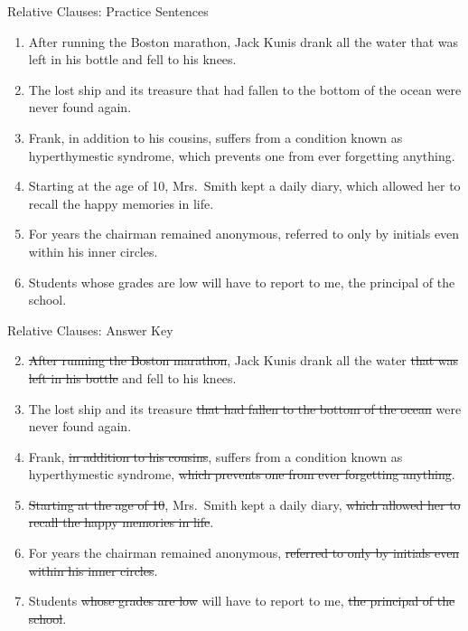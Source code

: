 \documentclass[aspectratio=169,11pt]{beamer}
\begin{document}
\begin{frame}{Relative Clauses: Practice Sentences}
\small
\begin{enumerate}
  \setcounter{enumi}{0} %
  \item After running the Boston marathon, Jack Kunis drank all the water that was left in his bottle and fell to his knees.
  \item The lost ship and its treasure that had fallen to the bottom of the ocean were never found again.
  \item Frank, in addition to his cousins, suffers from a condition known as hyperthymestic syndrome, which prevents one from ever forgetting anything.
  \item Starting at the age of 10, Mrs.\ Smith kept a daily diary, which allowed her to recall the happy memories in life.
  \item For years the chairman remained anonymous, referred to only by initials even within his inner circles.
  \item Students whose grades are low will have to report to me, the principal of the school.
\end{enumerate}
\end{frame}


\begin{frame}{Relative Clauses: Answer Key}
\small
\begin{enumerate}
  \setcounter{enumi}{1}
  \item \sout{After running the Boston marathon}, Jack Kunis drank all the water \sout{that was left in his bottle} and fell to his knees.
  \item The lost ship and its treasure \sout{that had fallen to the bottom of the ocean} were never found again.
  \item Frank, \sout{in addition to his cousins}, suffers from a condition known as hyperthymestic syndrome, \sout{which prevents one from ever forgetting anything}.
  \item \sout{Starting at the age of 10}, Mrs.\ Smith kept a daily diary, \sout{which allowed her to recall the happy memories in life}.
  \item For years the chairman remained anonymous, \sout{referred to only by initials even within his inner circles}.
  \item Students \sout{whose grades are low} will have to report to me, \sout{the principal of the school}.
\end{enumerate}
\end{frame}
\end{document}
